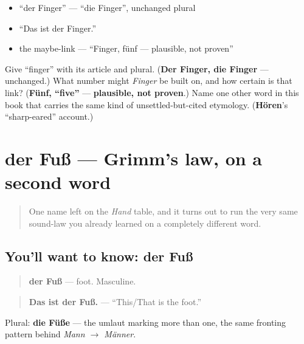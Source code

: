 \begin{itemize}
\raggedright
  \item \textquotedblleft{}der Finger\textquotedblright{} — \textquotedblleft{}die Finger\textquotedblright{}, unchanged plural
  \item \textquotedblleft{}Das ist der Finger.\textquotedblright{}
  \item the maybe-link — \textquotedblleft{}Finger, fünf — plausible, not proven\textquotedblright{}
\end{itemize}

\begin{tcolorbox}[breakable,colback=teal!4,colframe=teal!35!black,title={Before you move on}]
Give \textquotedblleft{}finger\textquotedblright{} with its article and plural. (\textbf{Der Finger, die Finger} — unchanged.) What number might \emph{Finger} be built on, and how certain is that link? (\textbf{Fünf, \textquotedblleft{}five\textquotedblright{}} — \textbf{plausible, not proven}.) Name one other word in this book that carries the same kind of unsettled-but-cited etymology. (\textbf{Hören}'s \textquotedblleft{}sharp-eared\textquotedblright{} account.)
\end{tcolorbox}
\section[der Fuß]{der Fuß — Grimm's law, on a second word}

\label{lesson:GE-C31-fuss}



\begin{quote}
One name left on the \emph{Hand} table, and it turns out to run the very same sound-law you already learned on a completely different word.
\end{quote}

\subsection*{You'll want to know: der Fuß}
\begin{quote}
\textbf{der Fuß} — foot. Masculine.
\end{quote}

\begin{quote}
\textbf{Das ist der Fuß.} — \textquotedblleft{}This/That is the foot.\textquotedblright{}
\end{quote}

Plural: \textbf{die Füße} — the umlaut marking more than one, the same fronting pattern behind \emph{Mann $\to$ Männer}.

